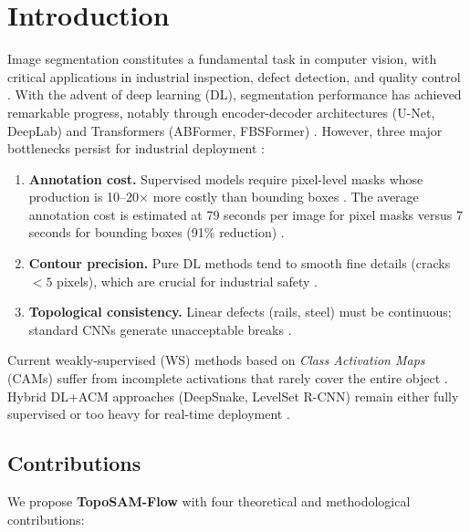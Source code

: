 \documentclass[12pt, a4paper]{article}
\begin{document}
\section{Introduction}
\label{sec:introduction}

Image segmentation constitutes a fundamental task in computer vision, with critical applications in industrial inspection, defect detection, and quality control \cite{wang2024pixel, li2024soldering}. With the advent of deep learning (DL), segmentation performance has achieved remarkable progress, notably through encoder-decoder architectures (U-Net, DeepLab) and Transformers (ABFormer, FBSFormer) \cite{zheng2023abformer, shi2024fbsformer}. However, three major bottlenecks persist for industrial deployment \cite{review2025}:

\begin{enumerate}
    \item \textbf{Annotation cost.} Supervised models require pixel-level masks whose production is 10–20$\times$ more costly than bounding boxes \cite{review2025}. The average annotation cost is estimated at 79 seconds per image for pixel masks versus 7 seconds for bounding boxes (91\% reduction) \cite{annotation_cost2024}.
    \item \textbf{Contour precision.} Pure DL methods tend to smooth fine details (cracks $<5$ pixels), which are crucial for industrial safety \cite{review2025}.
    \item \textbf{Topological consistency.} Linear defects (rails, steel) must be continuous; standard CNNs generate unacceptable breaks \cite{review2025}.
\end{enumerate}

Current weakly-supervised (WS) methods based on \textit{Class Activation Maps} (CAMs) suffer from incomplete activations that rarely cover the entire object \cite{review2025}. Hybrid DL+ACM approaches (DeepSnake, LevelSet R-CNN) remain either fully supervised or too heavy for real-time deployment \cite{review2025}.

\subsection{Contributions}

We propose \textbf{TopoSAM-Flow} with four theoretical and methodological contributions:
\end{document}
